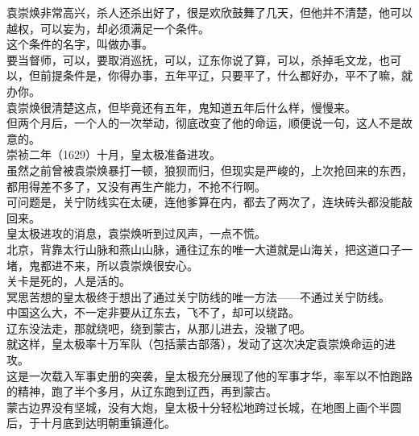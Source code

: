 \begin{multicols}{\theparacolNo}
袁崇焕非常高兴，杀人还杀出好了，很是欢欣鼓舞了几天，但他并不清楚，他可以越权，可以妄为，却必须满足一个条件。\\

这个条件的名字，叫做办事。\\

要当督师，可以，要取消巡抚，可以，辽东你说了算，可以，杀掉毛文龙，也可以，但前提条件是，你得办事，五年平辽，只要平了，什么都好办，平不了嘛，就办你。\\

袁崇焕很清楚这点，但毕竟还有五年，鬼知道五年后什么样，慢慢来。\\

但两个月后，一个人的一次举动，彻底改变了他的命运，顺便说一句，这人不是故意的。\\

崇祯二年（1629）十月，皇太极准备进攻。\\

虽然之前曾被袁崇焕暴打一顿，狼狈而归，但现实是严峻的，上次抢回来的东西，都用得差不多了，又没有再生产能力，不抢不行啊。\\

可问题是，关宁防线实在太硬，连他爹算在内，都去了两次了，连块砖头都没能敲回来。\\

皇太极进攻的消息，袁崇焕听到过风声，一点不慌。\\

北京，背靠太行山脉和燕山山脉，通往辽东的唯一大道就是山海关，把这道口子一堵，鬼都进不来，所以袁崇焕很安心。\\

关卡是死的，人是活的。\\

冥思苦想的皇太极终于想出了通过关宁防线的唯一方法——不通过关宁防线。\\

中国这么大，不一定非要从辽东去，飞不了，却可以绕路。\\

辽东没法走，那就绕吧，绕到蒙古，从那儿进去，没辙了吧。\\

就这样，皇太极率十万军队（包括蒙古部落），发动了这次决定袁崇焕命运的进攻。\\

这是一次载入军事史册的突袭，皇太极充分展现了他的军事才华，率军以不怕跑路的精神，跑了半个多月，从辽东跑到辽西，再到蒙古。\\

蒙古边界没有坚城，没有大炮，皇太极十分轻松地跨过长城，在地图上画个半圆后，于十月底到达明朝重镇遵化。\\


\end{multicols}
